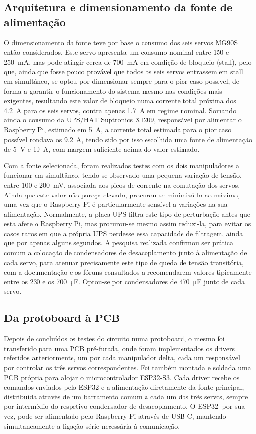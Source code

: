 \subsection{Arquitetura e dimensionamento da fonte de alimentação}
O dimensionamento da fonte teve por base o consumo dos seis servos MG90S então considerados. Este servo apresenta um consumo nominal entre 150 e \SI{250}{\milli\ampere}, mas pode atingir cerca de \SI{700}{\milli\ampere} em condição de bloqueio (stall), pelo que, ainda que fosse pouco provável que todos os seis servos entrassem em stall em simultâneo, se optou por dimensionar sempre para o pior caso possível, de forma a garantir o funcionamento do sistema mesmo nas condições mais exigentes, resultando este valor de bloqueio numa corrente total próxima dos \SI{4.2}{\ampere} para os seis servos, contra apenas \SI{1.7}{\ampere} em regime nominal. Somando ainda o consumo da UPS/HAT Suptronics X1209, responsável por alimentar o Raspberry Pi, estimado em \SI{5}{\ampere}, a corrente total estimada para o pior caso possível rondava os \SI{9.2}{\ampere}, tendo sido por isso escolhida uma fonte de alimentação de \SI{5}{\volt} e \SI{10}{\ampere}, com margem suficiente acima do valor estimado.

Com a fonte selecionada, foram realizados testes com os dois manipuladores a funcionar em simultâneo, tendo-se observado uma pequena variação de tensão, entre 100 e \SI{200}{\milli\volt}, associada aos picos de corrente na comutação dos servos. Ainda que este valor não pareça elevado, procurou-se minimizá-lo ao máximo, uma vez que o Raspberry Pi é particularmente sensível a variações na sua alimentação. Normalmente, a placa UPS filtra este tipo de perturbação antes que esta afete o Raspberry Pi, mas procurou-se mesmo assim reduzi-la, para evitar os casos raros em que a própria UPS perdesse essa capacidade de filtragem, ainda que por apenas alguns segundos. A pesquisa realizada confirmou ser prática comum a colocação de condensadores de desacoplamento junto à alimentação de cada servo, para atenuar precisamente este tipo de queda de tensão transitória, com a documentação e os fóruns consultados a recomendarem valores tipicamente entre os 230 e os \SI{700}{\micro\farad}. Optou-se por condensadores de \SI{470}{\micro\farad} junto de cada servo.

\subsection{Da protoboard à PCB}
Depois de concluídos os testes do circuito numa protoboard, o mesmo foi transferido para uma PCB pré-furada, onde foram implementados os drivers referidos anteriormente, um por cada manipulador delta, cada um responsável por controlar os três servos correspondentes. Foi também montada e soldada uma PCB própria para alojar o microcontrolador ESP32-S3. Cada driver recebe os comandos enviados pelo ESP32 e a alimentação diretamente da fonte principal, distribuída através de um barramento comum a cada um dos três servos, sempre por intermédio do respetivo condensador de desacoplamento. O ESP32, por sua vez, pode ser alimentado pelo Raspberry Pi através de USB-C, mantendo simultaneamente a ligação série necessária à comunicação.

